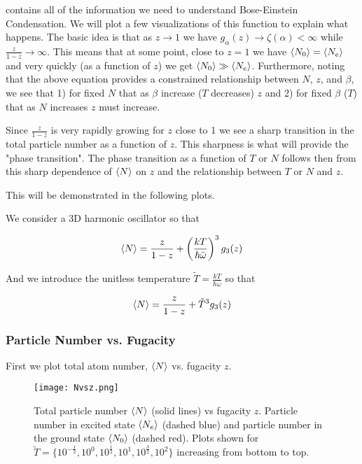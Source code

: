 \documentclass[12pt]{article}
\begin{document}
contains all of the information we need to understand Bose-Einstein Condensation. We will plot a few visualizations of this function to explain what happens. The basic idea is that as $z\rightarrow 1$ we have $g_{\alpha}(z)\rightarrow \zeta(\alpha)<\infty$ while $\frac{z}{1-z}\rightarrow \infty$. This means that at some point, close to $z=1$ we have $\Braket{N_0}=\Braket{N_e}$ and very quickly (as a function of $z$) we get $\Braket{N_0}\gg\Braket{N_e}$. Furthermore, noting that the above equation provides a constrained relationship between $N$, $z$, and $\beta$, we see that 1) for fixed $N$ that as $\beta$ increase ($T$ decreases) $z$ and 2) for fixed $\beta$ ($T$) that as $N$ increases $z$ must increase.

Since $\frac{z}{1-z}$ is very rapidly growing for $z$ close to 1 we see a sharp transition in the total particle number as a function of $z$. This sharpness is what will provide the "phase transition". The phase transition as a function of $T$ or $N$ follows then from this sharp dependence of $\Braket{N}$ on $z$ and the relationship between $T$ or $N$ and $z$.

This will be demonstrated in the following plots.

We consider a 3D harmonic oscillator so that

\begin{align}
\Braket{N} = \frac{z}{1-z} + \left(\frac{kT}{\hbar\bar{\omega}} \right)^3 g_3(z)
\end{align}

And we introduce the unitless temperature $\tilde{T} = \frac{kT}{\hbar\bar{\omega}}$ so that

\begin{align}
\Braket{N} = \frac{z}{1-z} + \tilde{T}^3g_3(z)
\end{align}

\subsubsection{Particle Number vs. Fugacity}

First we plot total atom number, $\Braket{N}$ vs. fugacity $z$. 

\begin{figure}[h]
\texttt{[image: Nvsz.png]}
\caption{Total particle number $\braket{N}$ (solid lines) vs fugacity $z$. Particle number in excited state $\Braket{N_e}$ (dashed blue) and particle number in the ground state $\Braket{N_0}$ (dashed red). Plots shown for $\tilde{T} = \{10^{-\frac{1}{2}},10^0, 10^{\frac{1}{2}}, 10^1, 10^{\frac{3}{2}}, 10^2\}$ increasing from bottom to top.}
\end{figure}
\end{document}
